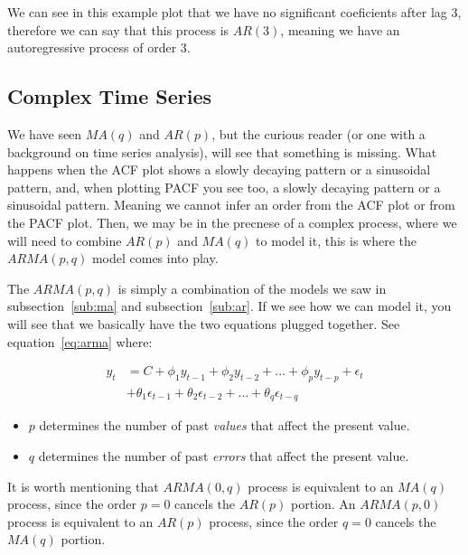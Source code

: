 \documentclass[journal]{IEEEtran}
\begin{document}
We can see in this example plot that we have no significant coeficients after
lag 3, therefore we can say that this process is $AR(3)$, meaning we have an
autoregressive process of order 3.

\subsection{Complex Time Series}

We have seen $MA(q)$ and $AR(p)$, but the curious reader (or one with a
background on time series analysis), will see that something is missing.  What
happens when the ACF plot shows a slowly decaying pattern or a sinusoidal
pattern, and, when plotting PACF you see too, a slowly decaying pattern or a
sinusoidal pattern. Meaning we cannot infer an order from the ACF plot or from
the PACF plot. Then, we may be in the precnese of a complex process, where we
will need to combine $AR(p)$ and $MA(q)$ to model it, this is where the
$ARMA(p, q)$ model comes into play.

The $ARMA(p, q)$  is simply a combination of the models we saw in
subsection~\ref{sub:ma} and subsection~\ref{sub:ar}. If we see how we can
model it, you will see that we basically have the two equations plugged
together. See equation~\ref{eq:arma} where:

\begin{equation}
\begin{aligned}
    y_t &= C + \phi_1 y_{t-1} + \phi_2 y_{t-2} +
            ... +  \phi_p y_{t-p} + \epsilon_t \\
        &+ \theta_1\epsilon_{t-1} + \theta_2\epsilon_{t-2} +
            ... +  \theta_q\epsilon_{t-q}
    \label{eq:arma}
\end{aligned}
\end{equation}

\begin{itemize}
    \item $p$ determines the number of past \emph{values} that affect the present
        value.
    \item $q$ determines the number of past \emph{errors} that affect the
        present value.
\end{itemize}

It is worth mentioning that $ARMA(0,q)$ process is equivalent to an $MA(q)$
process, since the order $p = 0$ cancels the $AR(p)$ portion. An $ARMA(p,0)$
process is equivalent to an $AR(p)$ process, since the order $q = 0$ cancels
the $MA(q)$ portion.
\end{document}
